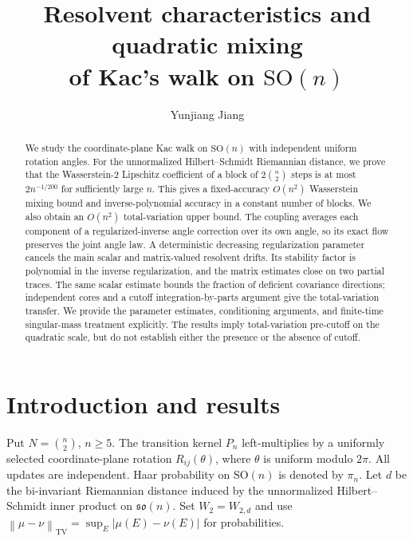 \documentclass[11pt]{article}
\title{Resolvent characteristics and quadratic mixing\\of Kac's walk on $\mathrm{SO}(n)$}
\author{Yunjiang Jiang}
\date{}
\theoremstyle{definition}\newtheorem{definition}[theorem]{Definition}
\theoremstyle{remark}\newtheorem{remark}[theorem]{Remark}
\newcommand{\SO}{\mathrm{SO}}
\newcommand{\g}{\mathfrak{so}(n)}
\newcommand{\TV}{\mathrm{TV}}
\newcommand{\norm}[1]{\left\lVert#1\right\rVert}
\begin{document}
\maketitle
\begin{abstract}
We study the coordinate-plane Kac walk on $\mathrm{SO}(n)$ with independent uniform rotation angles. For the unnormalized Hilbert--Schmidt Riemannian distance, we prove that the Wasserstein-$2$ Lipschitz coefficient of a block of $2\binom n2$ steps is at most $2n^{-1/200}$ for sufficiently large $n$. This gives a fixed-accuracy $O(n^2)$ Wasserstein mixing bound and inverse-polynomial accuracy in a constant number of blocks. We also obtain an $O(n^2)$ total-variation upper bound. The coupling averages each component of a regularized-inverse angle correction over its own angle, so its exact flow preserves the joint angle law. A deterministic decreasing regularization parameter cancels the main scalar and matrix-valued resolvent drifts. Its stability factor is polynomial in the inverse regularization, and the matrix estimates close on two partial traces. The same scalar estimate bounds the fraction of deficient covariance directions; independent cores and a cutoff integration-by-parts argument give the total-variation transfer. We provide the parameter estimates, conditioning arguments, and finite-time singular-mass treatment explicitly. The results imply total-variation pre-cutoff on the quadratic scale, but do not establish either the presence or the absence of cutoff.
\end{abstract}
\begingroup
\small
\tableofcontents
\endgroup
\clearpage

\section{Introduction and results}\label{sec:introduction}
Put $N=\binom n2$, $n\ge5$. The transition kernel $P_n$ left-multiplies by a uniformly selected coordinate-plane rotation $R_{ij}(\theta)$, where $\theta$ is uniform modulo $2\pi$. All updates are independent. Haar probability on $\SO(n)$ is denoted by $\pi_n$. Let $d$ be the bi-invariant Riemannian distance induced by the unnormalized Hilbert--Schmidt inner product on $\g$. Set $W_2=W_{2,d}$ and use $\norm{\mu-\nu}_{\TV}=\sup_E|\mu(E)-\nu(E)|$ for probabilities.
\end{document}

